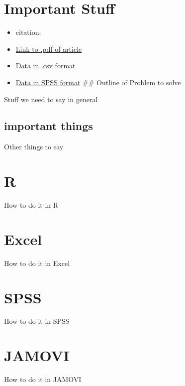 \documentclass[]{book}
\providecommand{\tightlist}{%
  \setlength{\itemsep}{0pt}\setlength{\parskip}{0pt}}
\theoremstyle{definition}
\theoremstyle{definition}
\theoremstyle{definition}
\theoremstyle{remark}
\begin{document}
\section{Important Stuff}\label{important-stuff-5}

\begin{itemize}
\tightlist
\item
  citation:
\item
  \href{}{Link to .pdf of article}
\item
  \href{}{Data in .csv format}
\item
  \href{}{Data in SPSS format} \#\# Outline of Problem to solve
\end{itemize}

Stuff we need to say in general

\subsection{important things}\label{important-things-4}

Other things to say

\section{R}\label{r-11}

How to do it in R

\section{Excel}\label{excel-10}

How to do it in Excel

\section{SPSS}\label{spss-10}

How to do it in SPSS

\section{JAMOVI}\label{jamovi-10}

How to do it in JAMOVI


\end{document}
